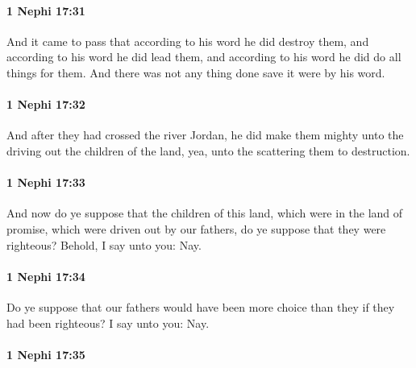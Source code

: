 		\paragraph{1 Nephi 17:31} %
			\label{1NEPHI-17-31}

			And it came to pass that according to his word he did destroy them,
			and according to his word he did lead them,
			and according to his word he did do all things for them.
			And there was not any thing done save it were by his word.

		\paragraph{1 Nephi 17:32} %
			\label{1NEPHI-17-32}

			And after they had crossed the river Jordan,
			he did make them mighty unto the driving out the children of the land,
			yea, unto the scattering them to destruction.

		\paragraph{1 Nephi 17:33} %
			\label{1NEPHI-17-33}

			And now do ye suppose that the children of this land,
			which were in the land of promise,
			which were driven out by our fathers,
			do ye suppose that they were righteous?
			Behold, I say unto you: Nay.

		\paragraph{1 Nephi 17:34} %
			\label{1NEPHI-17-34}

			Do ye suppose that our fathers would have been more choice than they
			if they had been righteous?
			I say unto you: Nay.

		\paragraph{1 Nephi 17:35} %
			\label{1NEPHI-17-35}

